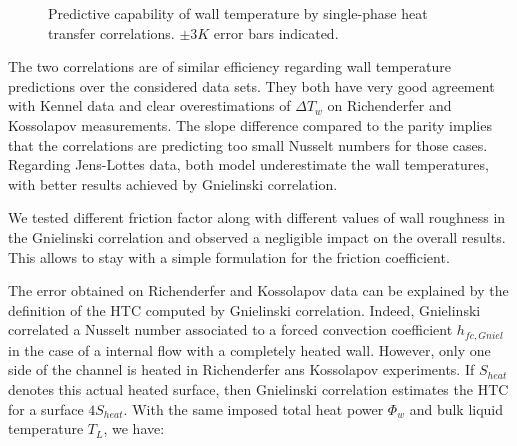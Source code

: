 \begin{figure}[h!]
\centering
{} 
\caption{Predictive capability of wall temperature by single-phase heat transfer correlations. $\pm 3K$ error bars indicated.}
\label{fig:dittus_gniel_htc}
\end{figure}

\npar
The two correlations are of similar efficiency regarding wall temperature predictions over the considered data sets. They both have very good agreement with Kennel data and clear overestimations of $\Delta T_{w}$ on Richenderfer and Kossolapov measurements. The slope difference compared to the parity implies that the correlations are predicting too small Nusselt numbers for those cases. Regarding Jens-Lottes data, both model underestimate the wall temperatures, with better results achieved by Gnielinski correlation.

\begin{remark*}{}
We tested different friction factor along with different values of wall roughness in the Gnielinski correlation and observed a negligible impact on the overall results. This allows to stay with a simple formulation for the friction coefficient.
\end{remark*}

\npar

The error obtained on Richenderfer and Kossolapov data can be explained by the definition of the HTC computed by Gnielinski correlation. Indeed, Gnielinski correlated a Nusselt number associated to a forced convection coefficient $h_{fc,Gniel}$ in the case of a internal flow with a completely heated wall. However, only one side of the channel is heated in Richenderfer ans Kossolapov experiments. If $S_{heat}$ denotes this actual heated surface, then Gnielinski correlation estimates the HTC for a surface $4S_{heat}$. With the same imposed total heat power $\Phi_{w}$ and bulk liquid temperature $T_{L}$, we have:


